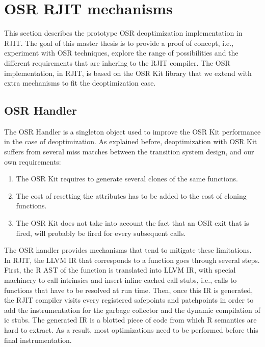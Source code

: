 \section{OSR RJIT mechanisms}
This section describes the prototype OSR deoptimization implementation in RJIT. 
The goal of this master thesis is to provide a proof of concept, i.e., experiment with OSR techniques, explore the range of possibilities and the different requirements that are inhering to the RJIT compiler.
The OSR implementation, in RJIT, is based on the OSR Kit\cite{OSRKit} library that we extend with extra mechanisms to fit the deoptimization case.  
\subsection{OSR Handler}
The OSR Handler is a singleton object used to improve the OSR Kit performance in the case of deoptimization. 
As explained before, deoptimization with OSR Kit suffers from several miss matches between the transition system design, and our own requirements: 
\begin{enumerate}
    \item The OSR Kit requires to generate several clones of the same functions.
    \item The cost of resetting the attributes has to be added to the cost of cloning functions.
    \item The OSR Kit does not take into account the fact that an OSR exit that is fired, will probably be fired for every subsequent calls.
\end{enumerate}
The OSR handler provides mechanisms that tend to mitigate these limitations.\\

In RJIT, the LLVM IR that corresponds to a function goes through several steps.
First, the R AST of the function is translated into LLVM IR, with special machinery to call intrinsics and insert inline cached call stubs, i.e., calls to functions that have to be resolved at run time.
Then, once this IR is generated, the RJIT compiler visits every registered safepoints and patchpoints in order to add the instrumentation for the garbage collector and the dynamic compilation of ic stubs.
The generated IR is a blotted piece of code from which R semantics are hard to extract.
As a result, most optimizations need to be performed before this final instrumentation.\\

